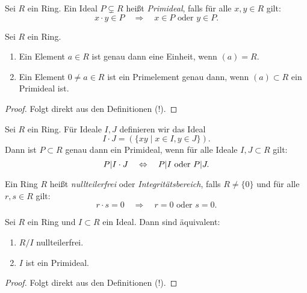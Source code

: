 \documentclass{book}
\begin{document}
\begin{defi}
    \label{defi:prim}
    Sei $R$ ein Ring. Ein Ideal $P \subsetneq R$ heißt \emph{Primideal}, falls für alle $x,y \in R$ gilt:
    \[
        x \cdot y \in P \quad \Rightarrow \quad \text{$x \in P$ oder $y \in P$}.
    \]
\end{defi}

\begin{prop}
    \label{prop:elementideal}
    Sei $R$ ein Ring.
    \begin{enumerate}
        \item Ein Element $a \in R$ ist genau dann eine Einheit, wenn $(a) = R$. 
        \item Ein Element $0 \neq a \in R$ ist ein Primelement genau dann, wenn $(a)
            \subset R$ ein Primideal ist. 
    \end{enumerate}
\end{prop}
\begin{proof}
    Folgt direkt aus den Definitionen (!).
\end{proof}

\begin{prob}
    \label{prob:prim}
    Sei $R$ ein Ring. Für Ideale $I,J$ definieren wir das Ideal
    \[
        I \cdot J = (\{ xy \; | \; x \in I, y \in J\}).
    \]
    Dann ist $P \subset R$ genau dann ein Primideal, wenn für alle Ideale $I,J \subset R$ gilt:
    \[
        P | I \cdot J \quad \Leftrightarrow \quad P | I \text{ oder } P | J.
    \]
\end{prob}

\begin{defi}
    \label{defi:integraldomain}
    Ein Ring $R$ heißt \emph{nullteilerfrei} oder \emph{Integritätsbereich}, falls $R \neq \{0\}$ und für alle
    $r,s \in R$ gilt:
    \[
        r \cdot s =0  \quad \Rightarrow \quad \text{$r = 0$ oder $s = 0$}.
    \]
\end{defi}

\begin{prop}
    \label{prop:nullteilerfreiprim}
    Sei $R$ ein Ring und $I \subset R$ ein Ideal. Dann sind äquivalent:
    \begin{enumerate}[label=(\roman*)]
        \item $R/I$ nullteilerfrei. 
        \item $I$ ist ein Primideal.
    \end{enumerate}
\end{prop}
\begin{proof}
    Folgt direkt aus den Definitionen (!).
\end{proof}
\end{document}
